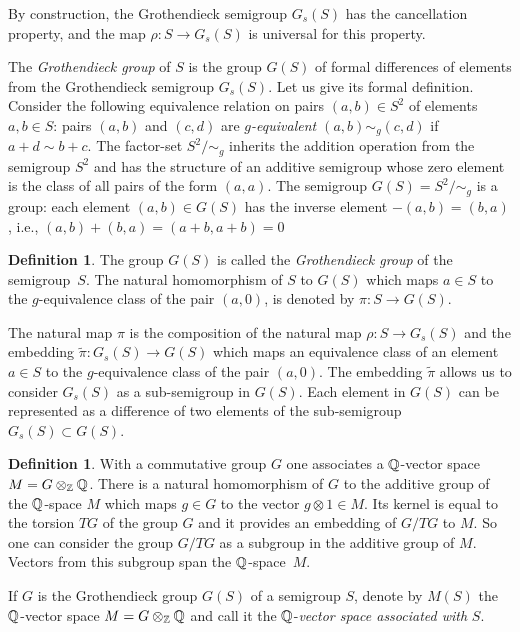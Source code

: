 \documentclass[11pt]{article}
\theoremstyle{plain}
\theoremstyle{definition}
\newtheorem{definition}[theorem]{Definition}
\begin{document}
By construction,  the Grothendieck semigroup $G_s(S)$ has the cancellation property, and the map $\rho: S \to G_s(S)$ is universal for this property.

The {\it Grothendieck group} of  $S$ is the group $G(S)$  of formal
differences of elements from the  Grothendieck semigroup $G_s(S)$. Let
us give its formal definition.
Consider the following equivalence relation on pairs $(a,b)\in S^2$ of
elements $a,b\in S$:  pairs $(a,b)$ and $(c,d)$ are {\it $g$-equivalent
  $(a,b)\sim_{g}(c,d)$}  if $a+d\sim b+c$.
  The factor-set $S^2/\sim_g$ inherits the addition operation from the
semigroup $S^2$ and has the structure of an additive semigroup  whose zero element is the class of all pairs of the form $(a,a)$. The semigroup $G(S)=S^2/\sim_g$ is a group:
  each element $(a,b)\in G(S)$ has the inverse element $-(a,b)=(b,a)$,
i.e., $(a,b)+(b,a)=(a+b,a+b)=0$

\begin{definition} The group $G(S)$ is called the  {\it Grothendieck
group}  of the semigroup~$S$. The  natural homomorphism
of $S$ to $G(S)$ which maps   $a\in S$ to the $g$-equivalence class of
the pair $(a,0)$,
is denoted by $\pi:S\to G(S)$.
\end{definition}

The natural map $\pi$ is the composition of the natural map  $\rho :S\to
G_s(S)$ and the   embedding $\tilde {\pi}:G_s(S)\to G(S)$ which maps an
equivalence class of an element $a\in S$ to the $g$-equivalence class of
the pair $(a,0)$.  The embedding $\tilde {\pi}$ allows us to consider
$G_s(S)$ as  a sub-semigroup in  $G(S)$.  Each element in $G(S)$ can be
represented as a difference of two elements of the sub-semigroup
$G_s(S)\subset G(S)$.

\begin{definition} With a commutative  group $G$ one associates a
$\Bbb Q$-vector space $M=G\otimes_\Bbb Z \Bbb Q$. There is a natural homomorphism
of $G$ to the additive  group of the $\Bbb Q$-space $M$   which maps
$g\in G$ to the vector $g\otimes 1\in M$. Its kernel is equal to the
torsion  $TG$ of the group $G$ and it provides  an embedding of $G/TG$
to $M$. So one can consider the group $G/TG$ as a subgroup in  the
additive group of  $M$. Vectors from this subgroup span the $\Bbb
Q$-space~$M$.

If $G$ is the Grothendieck group $G(S)$ of a semigroup $S$, denote  by
$M(S)$   the  $\Bbb Q$-vector space $M=G\otimes_\Bbb Z \Bbb Q$  and call
it the $\Bbb Q$-{\it vector space associated with} $S$.
\end{definition}
\end{document}
